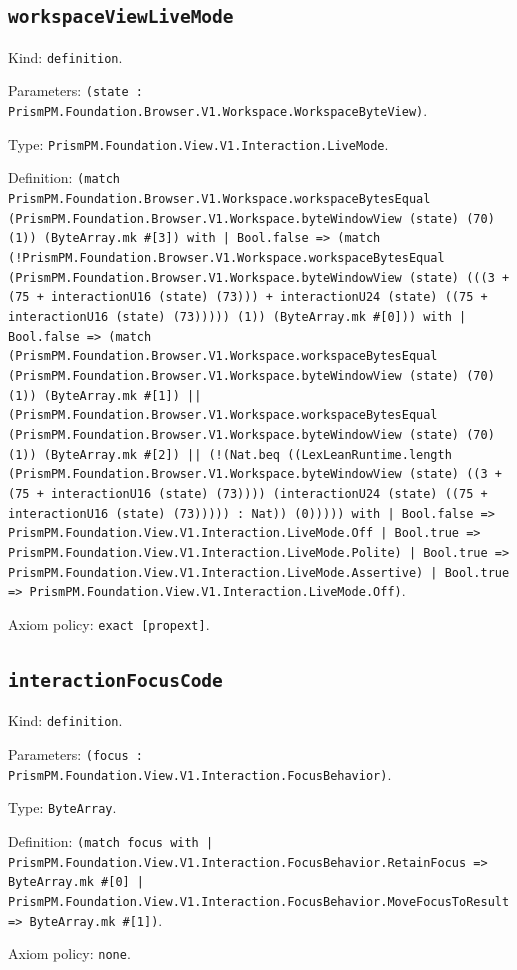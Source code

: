 \documentclass[11pt]{article}
\begin{document}
\subsection*{\texttt{workspaceViewLiveMode}}
\noindent Kind: \texttt{definition}.\par
\noindent Parameters: \texttt{(state : PrismPM.Foundation.Browser.V1.Workspace.WorkspaceByteView)}.\par
\noindent Type: \texttt{PrismPM.Foundation.View.V1.Interaction.LiveMode}.\par
\noindent Definition: \texttt{(match PrismPM.Foundation.Browser.V1.Workspace.workspaceBytesEqual (PrismPM.Foundation.Browser.V1.Workspace.byteWindowView (state) (70) (1)) (ByteArray.mk \#[3]) with | Bool.false => (match (!PrismPM.Foundation.Browser.V1.Workspace.workspaceBytesEqual (PrismPM.Foundation.Browser.V1.Workspace.byteWindowView (state) (((3 + (75 + interactionU16 (state) (73))) + interactionU24 (state) ((75 + interactionU16 (state) (73))))) (1)) (ByteArray.mk \#[0])) with | Bool.false => (match (PrismPM.Foundation.Browser.V1.Workspace.workspaceBytesEqual (PrismPM.Foundation.Browser.V1.Workspace.byteWindowView (state) (70) (1)) (ByteArray.mk \#[1]) || (PrismPM.Foundation.Browser.V1.Workspace.workspaceBytesEqual (PrismPM.Foundation.Browser.V1.Workspace.byteWindowView (state) (70) (1)) (ByteArray.mk \#[2]) || (!(Nat.beq ((LexLeanRuntime.length (PrismPM.Foundation.Browser.V1.Workspace.byteWindowView (state) ((3 + (75 + interactionU16 (state) (73)))) (interactionU24 (state) ((75 + interactionU16 (state) (73))))) : Nat)) (0))))) with | Bool.false => PrismPM.Foundation.View.V1.Interaction.LiveMode.Off | Bool.true => PrismPM.Foundation.View.V1.Interaction.LiveMode.Polite) | Bool.true => PrismPM.Foundation.View.V1.Interaction.LiveMode.Assertive) | Bool.true => PrismPM.Foundation.View.V1.Interaction.LiveMode.Off)}.\par
\noindent Axiom policy: \texttt{exact [propext]}.\par
\subsection*{\texttt{interactionFocusCode}}
\noindent Kind: \texttt{definition}.\par
\noindent Parameters: \texttt{(focus : PrismPM.Foundation.View.V1.Interaction.FocusBehavior)}.\par
\noindent Type: \texttt{ByteArray}.\par
\noindent Definition: \texttt{(match focus with | PrismPM.Foundation.View.V1.Interaction.FocusBehavior.RetainFocus => ByteArray.mk \#[0] | PrismPM.Foundation.View.V1.Interaction.FocusBehavior.MoveFocusToResult => ByteArray.mk \#[1])}.\par
\noindent Axiom policy: \texttt{none}.\par
\end{document}
